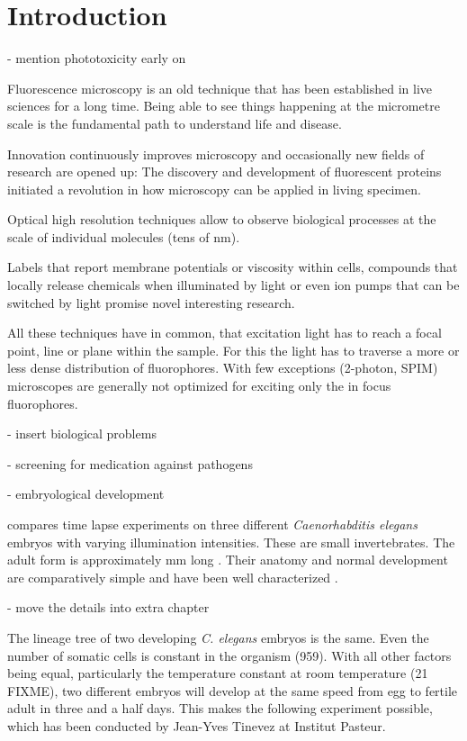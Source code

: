 \chapter{Introduction}
\label{sec:intro}

- mention phototoxicity early on

Fluorescence microscopy is an old technique that has been established    %
in live sciences for a long time. Being able to see things happening
at the micrometre scale is the fundamental path to understand life and
disease.

Innovation continuously improves microscopy and occasionally new        %
fields of research are opened up: The discovery and development of
fluorescent proteins initiated a revolution in how microscopy can be
applied in living specimen. 

Optical high resolution techniques allow to observe biological          %
processes at the scale of individual molecules (tens of nm).

Labels that report membrane potentials or viscosity within cells,       %
compounds that locally release chemicals when illuminated by light or
even ion pumps that can be switched by light promise novel interesting
research.

All these techniques have in common, that excitation light has to       %
reach a focal point, line or plane within the sample. For this the
light has to traverse a more or less dense distribution of
fluorophores.  With few exceptions (2-photon, SPIM) microscopes are
generally not optimized for exciting only the in focus fluorophores.

- insert biological problems

- screening for medication against pathogens

- embryological development

 compares time lapse experiments on three    %
different \emph{Caenorhabditis elegans} embryos with varying
illumination intensities. These are small invertebrates. The adult
form is approximately \unit[1]{mm} long . Their anatomy and normal
development are comparatively simple and have been well characterized
\citep{Durbin1987}.

- move the details into extra chapter

The lineage tree of two developing \emph{C. elegans} embryos is the     
same.  Even the number of somatic cells is constant in the organism
(959). With all other factors being equal, particularly the
temperature constant at room temperature (21 FIXME), two different
embryos will develop at the same speed from egg to fertile adult in
three and a half days. This makes the following experiment possible,
which has been conducted by Jean-Yves Tinevez at Institut Pasteur.

